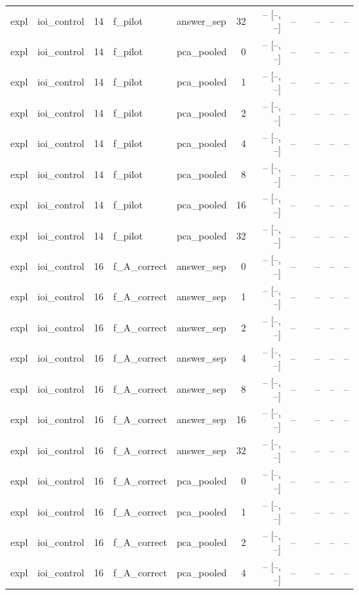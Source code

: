 \begin{tabular}{llrllrrrlrrr}
expl & ioi\_control & 14 & f\_pilot & answer\_sep & 32 & -- [--, --] & -- &  & -- & -- & -- \\
expl & ioi\_control & 14 & f\_pilot & pca\_pooled & 0 & -- [--, --] & -- &  & -- & -- & -- \\
expl & ioi\_control & 14 & f\_pilot & pca\_pooled & 1 & -- [--, --] & -- &  & -- & -- & -- \\
expl & ioi\_control & 14 & f\_pilot & pca\_pooled & 2 & -- [--, --] & -- &  & -- & -- & -- \\
expl & ioi\_control & 14 & f\_pilot & pca\_pooled & 4 & -- [--, --] & -- &  & -- & -- & -- \\
expl & ioi\_control & 14 & f\_pilot & pca\_pooled & 8 & -- [--, --] & -- &  & -- & -- & -- \\
expl & ioi\_control & 14 & f\_pilot & pca\_pooled & 16 & -- [--, --] & -- &  & -- & -- & -- \\
expl & ioi\_control & 14 & f\_pilot & pca\_pooled & 32 & -- [--, --] & -- &  & -- & -- & -- \\
expl & ioi\_control & 16 & f\_A\_correct & answer\_sep & 0 & -- [--, --] & -- &  & -- & -- & -- \\
expl & ioi\_control & 16 & f\_A\_correct & answer\_sep & 1 & -- [--, --] & -- &  & -- & -- & -- \\
expl & ioi\_control & 16 & f\_A\_correct & answer\_sep & 2 & -- [--, --] & -- &  & -- & -- & -- \\
expl & ioi\_control & 16 & f\_A\_correct & answer\_sep & 4 & -- [--, --] & -- &  & -- & -- & -- \\
expl & ioi\_control & 16 & f\_A\_correct & answer\_sep & 8 & -- [--, --] & -- &  & -- & -- & -- \\
expl & ioi\_control & 16 & f\_A\_correct & answer\_sep & 16 & -- [--, --] & -- &  & -- & -- & -- \\
expl & ioi\_control & 16 & f\_A\_correct & answer\_sep & 32 & -- [--, --] & -- &  & -- & -- & -- \\
expl & ioi\_control & 16 & f\_A\_correct & pca\_pooled & 0 & -- [--, --] & -- &  & -- & -- & -- \\
expl & ioi\_control & 16 & f\_A\_correct & pca\_pooled & 1 & -- [--, --] & -- &  & -- & -- & -- \\
expl & ioi\_control & 16 & f\_A\_correct & pca\_pooled & 2 & -- [--, --] & -- &  & -- & -- & -- \\
expl & ioi\_control & 16 & f\_A\_correct & pca\_pooled & 4 & -- [--, --] & -- &  & -- & -- & -- \\

\end{tabular}
